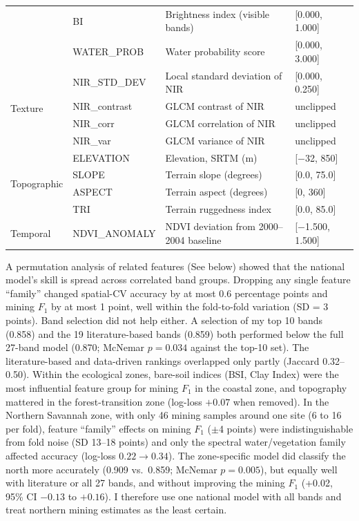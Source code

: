 \documentclass[]{interact}
\begin{document}
\begin{table}[H]
{\begin{tabular}{@{}llll@{}}
& BI          & Brightness index (visible bands)                & [0.000, 1.000] \\
& WATER\_PROB & Water probability score                         & [0.000, 3.000] \\
\midrule
\multirow{4}{*}{Texture}
& NIR\_STD\_DEV  & Local standard deviation of NIR & [0.000, 0.250] \\
& NIR\_contrast  & GLCM contrast of NIR            & unclipped \\
& NIR\_corr      & GLCM correlation of NIR         & unclipped \\
& NIR\_var       & GLCM variance of NIR            & unclipped \\
\midrule
\multirow{4}{*}{Topographic}
& ELEVATION & Elevation, SRTM (m)       & [$-$32, 850] \\
& SLOPE     & Terrain slope (degrees)   & [0.0, 75.0] \\
& ASPECT    & Terrain aspect (degrees)  & [0, 360] \\
& TRI       & Terrain ruggedness index  & [0.0, 85.0] \\
\midrule
Temporal
& NDVI\_ANOMALY & NDVI deviation from 2000--2004 baseline & [$-$1.500, 1.500] \\
\bottomrule
\end{tabular}%
}
\end{table}

A permutation analysis of related features (See below) showed that the national model's skill is spread across correlated band groups. Dropping any single feature ``family'' changed spatial-CV accuracy by at most 0.6 percentage points and mining $F_1$ by at most 1 point, well within the fold-to-fold variation (SD = 3 points). Band selection did not help either. A selection of my top 10 bands (0.858) and the 19 literature-based bands (0.859) both performed below the full 27-band model (0.870; McNemar $p = 0.034$ against the top-10 set). The literature-based and data-driven rankings overlapped only partly (Jaccard 0.32--0.50). Within the ecological zones, bare-soil indices (BSI, Clay Index) were the most influential feature group for mining $F_1$ in the coastal zone, and topography mattered in the forest-transition zone (log-loss $+0.07$ when removed). In the Northern Savannah zone, with only 46 mining samples around one site (6 to 16 per fold), feature ``family'' effects on mining $F_1$ ($\pm$4 points) were indistinguishable from fold noise (SD 13--18 points) and only the spectral water/vegetation family affected accuracy (log-loss $0.22 \rightarrow 0.34$). The zone-specific model did classify the north more accurately (0.909 vs.\ 0.859; McNemar $p = 0.005$), but equally well with literature or all 27 bands, and without improving the mining $F_1$ (+0.02, 95\% CI $-0.13$ to $+0.16$). I therefore use one national model with all bands and treat northern mining estimates as the least certain. 
\end{document}
